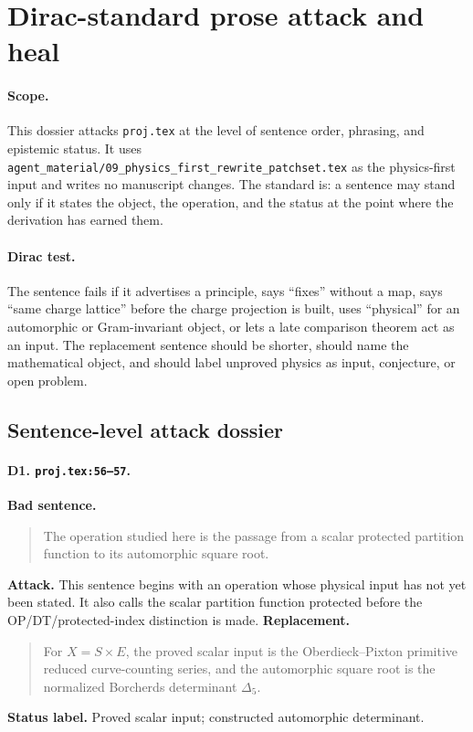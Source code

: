\section{Dirac-standard prose attack and heal}

\paragraph{Scope.}
This dossier attacks \texttt{proj.tex} at the level of sentence order,
phrasing, and epistemic status.  It uses
\texttt{agent\_material/09\_physics\_first\_rewrite\_patchset.tex} as the
physics-first input and writes no manuscript changes.  The standard is:
a sentence may stand only if it states the object, the operation, and the
status at the point where the derivation has earned them.

\paragraph{Dirac test.}
The sentence fails if it advertises a principle, says ``fixes'' without a
map, says ``same charge lattice'' before the charge projection is built,
uses ``physical'' for an automorphic or Gram-invariant object, or lets a
late comparison theorem act as an input.  The replacement sentence should
be shorter, should name the mathematical object, and should label
unproved physics as input, conjecture, or open problem.

\subsection{Sentence-level attack dossier}

\paragraph{D1. \texttt{proj.tex:56--57}.}
\textbf{Bad sentence.}
\begin{quote}\small
The operation studied here is the passage from a scalar protected
partition function to its automorphic square root.
\end{quote}
\textbf{Attack.}
This sentence begins with an operation whose physical input has not yet
been stated.  It also calls the scalar partition function protected before
the OP/DT/protected-index distinction is made.
\textbf{Replacement.}
\begin{quote}\small
For \(X=S\times E\), the proved scalar input is the
Oberdieck--Pixton primitive reduced curve-counting series, and the
automorphic square root is the normalized Borcherds determinant
\(\Delta_5\).
\end{quote}
\textbf{Status label.} Proved scalar input; constructed automorphic
determinant.

